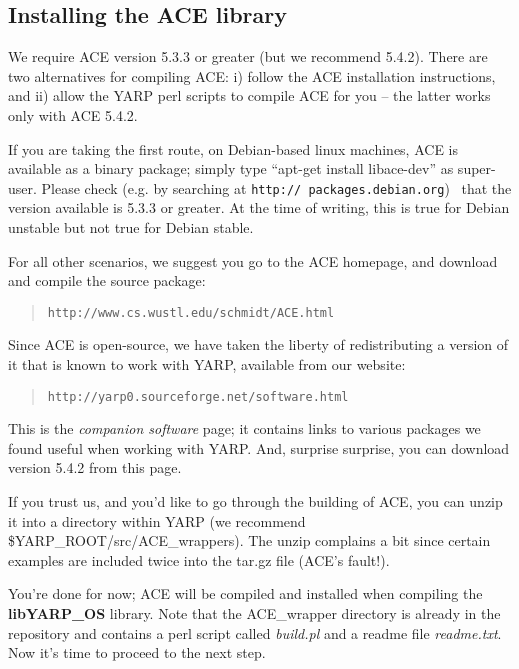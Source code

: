 \subsection{Installing the ACE library}
\label{sect:ace}

We require ACE version 5.3.3 or greater (but we recommend 5.4.2). There are two alternatives for compiling ACE: i) follow the ACE installation instructions, and ii) allow the YARP perl scripts to compile ACE for you -- the latter works only with ACE 5.4.2.

If you are taking the first route, on Debian-based linux machines, ACE is available as a binary package; simply type ``apt-get install libace-dev'' as super-user.  Please
check (e.g. by searching at {\tt http:// packages.debian.org}) ~that the version available is 5.3.3 or greater.  At the time of writing, this is true for Debian unstable but not true for Debian stable.

For all other scenarios, we suggest you go to the ACE homepage, and
download and compile the source package:

\begin{quote}
{\tt http://www.cs.wustl.edu/schmidt/ACE.html}
\end{quote}


Since ACE is open-source, we have taken the liberty of redistributing 
a version of it that is known to work with YARP, available from our 
website:

\begin{quote}
{\tt http://yarp0.sourceforge.net/software.html}
\end{quote}

This is the {\em companion software} page; it contains links to various packages we found useful when working with YARP. And, surprise surprise, you can download version 5.4.2 from this page.

If you trust us, and you'd like to go through the building of ACE, you can unzip it into a directory within YARP (we recommend \$YARP\_ROOT/src/ACE\_wrappers). The unzip complains a bit since certain examples are included twice into the tar.gz file (ACE's fault!).

You're done for now; ACE will be compiled and installed when compiling the {\bf libYARP\_OS} library. Note that the ACE\_wrapper directory is already in the repository and contains a perl script called {\em build.pl} and a readme file {\em readme.txt}. Now it's time to proceed to the next step.


